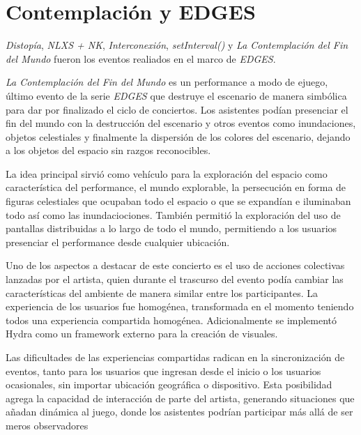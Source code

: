 
\section*{Contemplación y EDGES} %

\iffalse
\begin{itemize}
\item Distopía
\item domo 
\item Underborders
\item Milena y Concepción
\item setInterval()
\item Contemplación del fin del Mundo
\item sistemas mixtos
\item espacio y performance fusionados en Contemplación
\end{itemize}
\fi

\textit{Distopía}, \textit{NLXS + NK}, \textit{Interconexión}, \textit{setInterval()} y \textit{La Contemplación del Fin del Mundo} fueron los eventos realiados en el marco de \textit{EDGES}. 

\textit{La Contemplación del Fin del Mundo} es un performance a modo de ejuego, último evento de la serie \textit{EDGES} que destruye el escenario de manera simbólica para dar por finalizado el ciclo de conciertos. Los asistentes podían presenciar el fin del mundo con la destrucción del escenario y otros eventos como inundaciones, objetos celestiales y finalmente la dispersión de los colores del escenario, dejando a los objetos del espacio sin razgos reconocibles.

La idea principal sirvió como vehículo para la exploración del espacio como característica del performance, el mundo explorable, la persecución en forma de figuras celestiales que ocupaban todo el espacio o que se expandían e iluminaban todo así como las inundaciociones. También permitió la exploración del uso de pantallas distribuidas a lo largo de todo el mundo, permitiendo a los usuarios presenciar el performance desde cualquier ubicación.

Uno de los aspectos a destacar de este concierto es el uso de acciones colectivas lanzadas por el artista, quien durante el trascurso del evento podía cambiar las características del ambiente de manera similar entre los participantes. La experiencia de los usuarios fue homogénea, transformada en el momento teniendo todos una experiencia compartida homogénea. Adicionalmente se implementó Hydra \citep{hydra} como un framework externo para la creación de visuales.

Las dificultades de las experiencias compartidas radican en la sincronización de eventos, tanto para los usuarios que ingresan desde el inicio o los usuarios ocasionales, sin importar ubicación geográfica o dispositivo. Esta posibilidad agrega la capacidad de interacción de parte del artista, generando situaciones que añadan dinámica al juego, donde los asistentes podrían participar más allá de ser meros observadores

